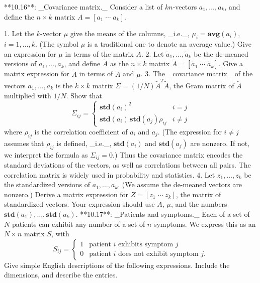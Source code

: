 

**10.16**: _Covariance matrix._ Consider a list of \(k\)\(n\)-vectors \(a_{1},\ldots,a_{k}\), and define the \(n\times k\) matrix \(A=[a_{1}\;\cdots\;a_{k}]\).

1. Let the \(k\)-vector \(\mu\) give the means of the columns, _i.e._, \(\mu_{i}=\mathbf{avg}(a_{i})\), \(i=1,\ldots,k\). (The symbol \(\mu\) is a traditional one to denote an average value.) Give an expression for \(\mu\) in terms of the matrix \(A\).
2. Let \(\tilde{a}_{1},\ldots,\tilde{a}_{k}\) be the de-meaned versions of \(a_{1},\ldots,a_{k}\), and define \(\tilde{A}\) as the \(n\times k\) matrix \(\tilde{A}=[\tilde{a}_{1}\;\cdots\;\tilde{a}_{k}]\). Give a matrix expression for \(\tilde{A}\) in terms of \(A\) and \(\mu\).
3. The _covariance matrix_ of the vectors \(a_{1},\ldots,a_{k}\) is the \(k\times k\) matrix \(\Sigma=(1/N)\tilde{A}^{T}\tilde{A}\), the Gram matrix of \(\tilde{A}\) multiplied with \(1/N\). Show that \[\Sigma_{ij}=\left\{\begin{array}{ll}\mathbf{std}(a_{i})^{2}&i=j\\ \mathbf{std}(a_{i})\,\mathbf{std}(a_{j})\rho_{ij}&i\neq j\end{array}\right.\] where \(\rho_{ij}\) is the correlation coefficient of \(a_{i}\) and \(a_{j}\). (The expression for \(i\neq j\) assumes that \(\rho_{ij}\) is defined, _i.e._, \(\mathbf{std}(a_{i})\) and \(\mathbf{std}(a_{j})\) are nonzero. If not, we interpret the formula as \(\Sigma_{ij}=0\).) Thus the covariance matrix encodes the standard deviations of the vectors, as well as correlations between all pairs. The correlation matrix is widely used in probability and statistics.
4. Let \(z_{1},\ldots,z_{k}\) be the standardized versions of \(a_{1},\ldots,a_{k}\). (We assume the de-meaned vectors are nonzero.) Derive a matrix expression for \(Z=[z_{1}\;\cdots\;z_{k}]\), the matrix of standardized vectors. Your expression should use \(A\), \(\mu\), and the numbers \(\mathbf{std}(a_{1}),\ldots,\mathbf{std}(a_{k})\).
**10.17**: _Patients and symptoms._ Each of a set of \(N\) patients can exhibit any number of a set of \(n\) symptoms. We express this as an \(N\times n\) matrix \(S\), with \[S_{ij}=\left\{\begin{array}{ll}1&\text{patient $i$ exhibits symptom $j$}\\ 0&\text{patient $i$ does not exhibit symptom $j$}.\end{array}\right.\] Give simple English descriptions of the following expressions. Include the dimensions, and describe the entries.

